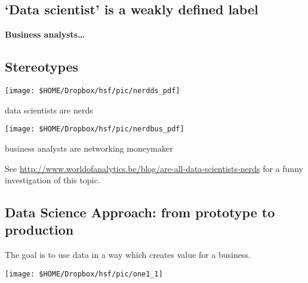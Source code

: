 
\subsection*{`Data scientist' is a weakly defined label}
\textbf{Business analysts\dots}


\pbn
\subsection*{Stereotypes}

\begin{minipage}[t]{0.49\textwidth}
	\texttt{[image: \$HOME/Dropbox/hsf/pic/nerdds\_pdf]}
	
	data scientists are nerds
\end{minipage}\hfill
\begin{minipage}[t]{0.49\textwidth}
	\texttt{[image: \$HOME/Dropbox/hsf/pic/nerdbus\_pdf]}
	
	business analysts are networking moneymaker
\end{minipage}


See \websmall \url{http://www.worldofanalytics.be/blog/are-all-data-scientists-nerds} for a funny investigation of this topic.



\pbn
\subsection*{Data Science Approach: from prototype to production}
The goal is to use data in a way which creates value for a business.
\begin{center}
	\texttt{[image: \$HOME/Dropbox/hsf/pic/one1\_1]}
\end{center}

